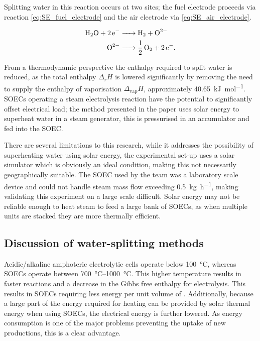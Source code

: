 Splitting water in this reaction occurs at two sites; the fuel electrode proceeds via reaction \eqref{eq:SE_fuel_electrode} and the air electrode via \eqref{eq:SE_air_electrode}.\cite{Schiller2019}

\begin{align}
	\ce{H2O + 2e- &-> H2 +O^2-}\label{eq:SE_fuel_electrode}\\
	\ce{O^2- &-> 1/2O2 + 2e-}\label{eq:SE_air_electrode}
.\end{align}

From a thermodynamic perspective the enthalpy required to split water is reduced, as the total enthalpy $\Delta_{r}H$ is lowered significantly by removing the need to supply the enthalpy of vaporisation $\Delta_{\text{vap}}H$, approximately \SI{40.65}{\kilo\joule\per\mole}\cite{Lemmon2017}.
SOECs operating a steam electrolysis reaction have the potential to significantly offset electrical load; the method presented in the paper uses solar energy to superheat water in a steam generator, this is pressurised in an accumulator and fed into the SOEC. 

There are several limitations to this research, while it addresses the possibility of superheating water using solar energy, the experimental set-up uses a solar simulator which is obviously an ideal condition, making this not necessarily geographically suitable.
The SOEC used by the team was a laboratory scale device and could not handle steam mass flow exceeding \SI{0.5}{\kilo\gram\per\hour}, making validating this experiment on a large scale difficult. 
Solar energy may not be reliable enough to heat steam to feed a large bank of SOECs, as when multiple units are stacked they are more thermally efficient.

\subsection{Discussion of water-splitting methods}%
\label{sub:discussion_of_water_splitting_methods}
Acidic/alkaline amphoteric  electrolytic cells operate below \SI{100}{\celsius}\cite{Lei2019}, whereas SOECs operate between \SIrange{700}{1000}{\celsius}\cite{Schiller2019}.
This higher temperature results in faster reactions and a decrease in the Gibbs free enthalpy for  electrolysis.
This results in SOECs requiring less energy per unit volume of .
Additionally, because a large part of the energy required for heating can be provided by solar thermal energy when using SOECs, the electrical energy is further lowered.
As energy consumption is one of the major problems preventing the uptake of new  productions, this is a clear advantage.

